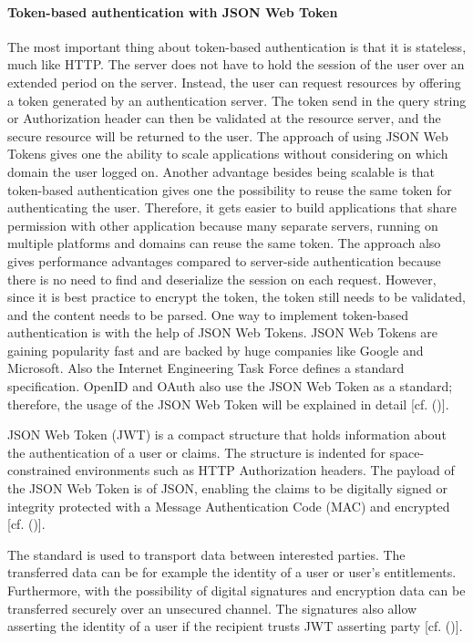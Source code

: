 {{\paragraph{
	Token-based authentication with JSON Web Token
}

The most important thing about token-based authentication is that it is stateless, much like HTTP. The server does not have to hold the session of the user over an extended period on the server. Instead, the user can request resources by offering a token generated by an authentication server. The token send in the query string or Authorization header can then be validated at the resource server, and the secure resource will be returned to the user. The approach of using JSON Web Tokens gives one the ability to scale applications without considering on which domain the user logged on. Another advantage besides being scalable is that token-based authentication gives one the possibility to reuse the same token for authenticating the user. Therefore, it gets easier to build applications that share permission with other application because many separate servers, running on multiple platforms and domains can reuse the same token. The approach also gives performance advantages compared to server-side authentication because there is no need to find and deserialize the session on each request. However, since it is best practice to encrypt the token, the token still needs to be validated, and the content needs to be parsed. One way to implement token-based authentication is with the help of JSON Web Tokens. JSON Web Tokens are gaining popularity fast and are backed by huge companies like Google and Microsoft. Also the Internet Engineering Task Force defines a standard specification. OpenID and OAuth also use the JSON Web Token as a standard; therefore, the usage of the JSON Web Token will be explained in detail [cf. (\cite{Tkalec:2015})].


JSON Web Token (JWT) is a compact structure that holds information about the authentication of a user or claims. The structure is indented for space-constrained environments such as HTTP Authorization headers. The payload of the JSON Web Token is of JSON, enabling the claims to be digitally signed or integrity protected with a Message Authentication Code (MAC) and encrypted [cf. (\cite{JWT:IETF:Jones:2015})].

The standard is used to transport data between interested parties. The transferred data can be for example the identity of a user or user’s entitlements. Furthermore, with the possibility of digital signatures and encryption data can be transferred securely over an unsecured channel. The signatures also allow asserting the identity of a user if the recipient trusts JWT asserting party [cf. (\cite{Siriwardena:JWTJWSJWE:2016})].

}}
